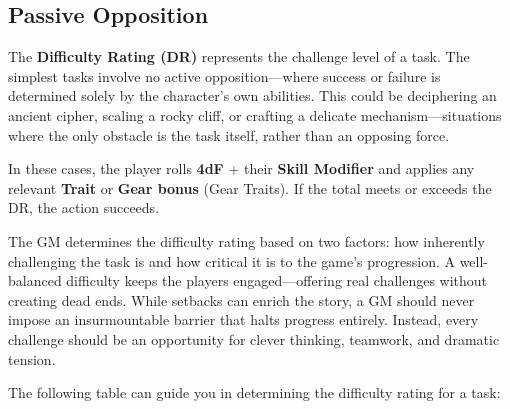 \subsection{Passive Opposition}
The \textbf{Difficulty Rating (DR)} represents the challenge level of a task. The simplest tasks involve no active opposition—where success or failure is determined solely by the character’s own abilities. This could be deciphering an ancient cipher, scaling a rocky cliff, or crafting a delicate mechanism—situations where the only obstacle is the task itself, rather than an opposing force.

In these cases, the player rolls \textbf{4dF} + their \textbf{Skill Modifier} and applies any relevant \textbf{Trait} or \textbf{Gear bonus} (Gear Traits). If the total meets or exceeds the DR, the action succeeds.

The GM determines the difficulty rating based on two factors: how inherently challenging the task is and how critical it is to the game’s progression. A well-balanced difficulty keeps the players engaged—offering real challenges without creating dead ends. While setbacks can enrich the story, a GM should never impose an insurmountable barrier that halts progress entirely. Instead, every challenge should be an opportunity for clever thinking, teamwork, and dramatic tension.

The following table can guide you in determining the difficulty rating for a task:

